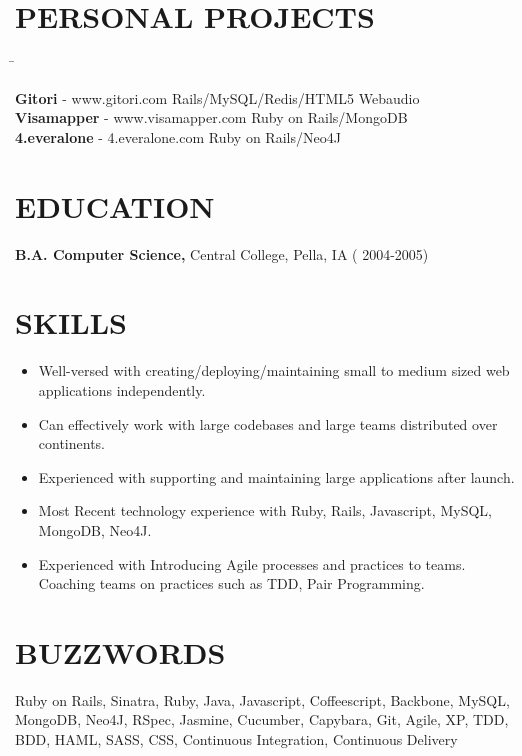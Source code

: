 \documentclass{res}
\begin{document}
\begin{resume}
\section{PERSONAL PROJECTS}  \vspace{-0.01in}   
   \begin{tabbing}
   \hspace{3.3in}\= \kill %

    {\bf Gitori} - www.gitori.com   \>Rails/MySQL/Redis/HTML5 Webaudio \\

    {\bf Visamapper} - www.visamapper.com   \>Ruby on Rails/MongoDB \\
 
    {\bf 4.everalone} - 4.everalone.com \>Ruby on Rails/Neo4J \\
\end{tabbing}

\section{EDUCATION}
    {\bf B.A. Computer Science,} Central College, Pella, IA
   ( 2004-2005)


\section{SKILLS}          
 \begin{itemize} \itemsep -2pt  %
\item Well-versed with creating/deploying/maintaining small to medium sized web applications independently.
\item Can effectively work with large codebases and large teams distributed over continents.
\item Experienced with supporting and maintaining large applications after launch.
\item Most Recent technology experience with Ruby, Rails, Javascript, MySQL, MongoDB, Neo4J. 
\item Experienced with Introducing Agile processes and practices to teams. Coaching teams on practices such as TDD, Pair Programming.

 \end{itemize}


\section{BUZZWORDS}          
Ruby on Rails, Sinatra, Ruby, Java, Javascript, Coffeescript, Backbone, MySQL, MongoDB, Neo4J, RSpec, Jasmine, Cucumber, Capybara, Git, Agile, XP, TDD, BDD, HAML, SASS, CSS, Continuous Integration, Continuous Delivery 
 
\end{resume}
\end{document}

